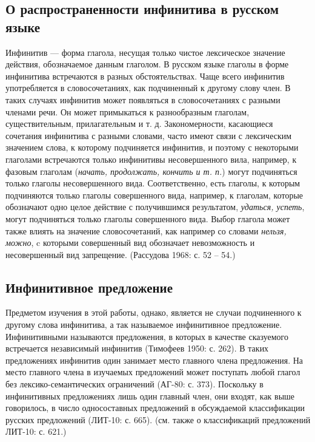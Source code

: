 \subsection{О распространенности инфинитива в русском языке}

Инфинитив --- форма глагола, несущая только чистое лексическое значение действия, обозначаемое данным глаголом. В русском языке глаголы в форме инфинитива встречаются в разных обстоятельствах. Чаще всего инфинитив употребляется в словосочетаниях, как подчиненный к другому слову член. В таких случаях инфинитив может появляться в словосочетаниях с разными членами речи. Он может примыкаться к разнообразным глаголам, существительным, прилагательным и т. д. Закономерности, касающиеся сочетания инфинитива с разными словами, часто имеют связи с лексическим значением слова, к которому подчиняется инфинитив, и поэтому с некоторыми глаголами встречаются только инфинитивы несовершенного вила, например, к фазовым глаголам (\textit{начать, продолжать, кончить и т. п.}) могут подчиняться только глаголы несовершенного вида. Соответственно, есть глаголы, к которым подчиняются только глаголы совершенного вида, например, к глаголам, которые обозначают одно целое действие с получившимся результатом, \textit{удаться, успеть}, могут подчиняться только глаголы совершенного вида. Выбор глагола может также влиять на значение словосочетаний, как например со словами \textit{нельзя, можно}, c которыми совершенный вид обозначает невозможность и несовершенный вид запрещение. (Рассудова 1968: с. 52 -- 54.)

\subsection{Инфинитивное предложение}

Предметом изучения в этой работы, однако, является не случаи подчиненного к другому слова инфинитива, а так называемое инфинитивное предложение. Инфинитивными называются предложения, в которых в качестве сказуемого встречается независимый инфинитив (Тимофеев 1950: с. 262). В таких предложениях инфинитив один занимает место главного члена предложения. На место главного члена в изучаемых предложений может поступать любой глагол без лексико-семантических ограничений (АГ-80: с. 373). Поскольку в инфинитивных предложениях лишь один главный член, они входят, как выше говорилось, в число односоставных предложений в обсуждаемой классификации русских предложений (ЛИТ-10: с. 665). (см. также о классификаций предложений ЛИТ-10: с. 621.)

